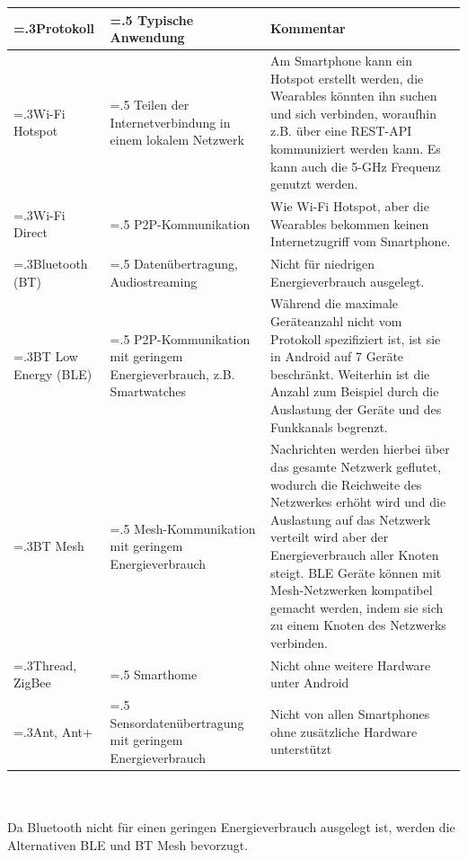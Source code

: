 \begin{minipage}{\linewidth}
        \renewcommand\footnoterule{}
        \renewcommand{\thefootnote}{\alph{footnote}}
	\label{tab:p2p_protocols}
	\begin{tabularx}{\linewidth}{>{\hsize=.3\hsize}X|>{\hsize=.5\hsize}X|X}
		Protokoll & Typische Anwendung & Kommentar\\
		\hline
		Wi-Fi Hotspot & Teilen der Internetverbindung in einem lokalem Netzwerk & Am Smartphone kann ein Hotspot erstellt werden, die Wearables könnten ihn suchen und sich verbinden, woraufhin z.B. über eine REST-API kommuniziert werden kann.
		Es kann auch die 5-GHz Frequenz genutzt werden.\\
		Wi-Fi Direct & P2P-Kommunikation & Wie Wi-Fi Hotspot, aber die Wearables bekommen keinen Internetzugriff vom Smartphone.\\
		Bluetooth (BT) & Datenübertragung, Audiostreaming & Nicht für niedrigen Energieverbrauch ausgelegt.\\
		BT Low Energy (BLE) & P2P-Kommunikation mit geringem Energieverbrauch, z.B. Smartwatches & Während die maximale Geräteanzahl nicht vom Protokoll spezifiziert ist, ist sie in Android auf 7 Geräte beschränkt\footnotemark[1].
		Weiterhin ist die Anzahl zum Beispiel durch die Auslastung der Geräte und des Funkkanals begrenzt.\\
		BT Mesh & Mesh-Kommunikation mit geringem Energieverbrauch & Nachrichten werden hierbei über das gesamte Netzwerk geflutet, wodurch die Reichweite des Netzwerkes erhöht wird und die Auslastung auf das Netzwerk verteilt wird aber der Energieverbrauch aller Knoten steigt.
		BLE Geräte können mit Mesh-Netzwerken kompatibel gemacht werden, indem sie sich zu einem Knoten des Netzwerks verbinden.\\
		Thread, ZigBee & Smarthome & Nicht ohne weitere Hardware unter Android\\
		Ant, Ant+ & Sen\-sor\-da\-ten\-über\-tra\-gung mit geringem Energieverbrauch & Nicht von allen Smartphones ohne zusätzliche Hardware unterstützt\\
	\end{tabularx}
\end{minipage}\\\\
Da Bluetooth nicht für einen geringen Energieverbrauch ausgelegt ist, werden die Alternativen BLE und BT Mesh bevorzugt.
